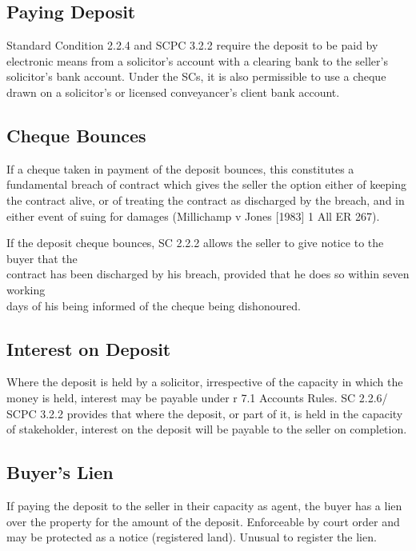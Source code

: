 \documentclass[
]{article}
\begin{document}
\hypertarget{paying-deposit}{%
\subsection{Paying Deposit}\label{paying-deposit}}

Standard Condition 2.2.4 and SCPC 3.2.2 require the deposit to be paid
by electronic means from a solicitor's account with a clearing bank to
the seller's solicitor's bank account. Under the SCs, it is also
permissible to use a cheque drawn on a solicitor's or licensed
conveyancer's client bank account.

\hypertarget{cheque-bounces}{%
\subsection{Cheque Bounces}\label{cheque-bounces}}

If a cheque taken in payment of the deposit bounces, this constitutes a
fundamental breach of contract which gives the seller the option either
of keeping the contract alive, or of treating the contract as discharged
by the breach, and in either event of suing for damages (Millichamp v
Jones {[}1983{]} 1 All ER 267).

If the deposit cheque bounces, SC 2.2.2 allows the seller to give notice
to the buyer that the\\
contract has been discharged by his breach, provided that he does so
within seven working\\
days of his being informed of the cheque being dishonoured.

\hypertarget{interest-on-deposit}{%
\subsection{Interest on Deposit}\label{interest-on-deposit}}

Where the deposit is held by a solicitor, irrespective of the capacity
in which the money is held, interest may be payable under r 7.1 Accounts
Rules. SC 2.2.6/ SCPC 3.2.2 provides that where the deposit, or part of
it, is held in the capacity of stakeholder, interest on the deposit will
be payable to the seller on completion.

\hypertarget{buyers-lien}{%
\subsection{Buyer's Lien}\label{buyers-lien}}

If paying the deposit to the seller in their capacity as agent, the
buyer has a lien over the property for the amount of the deposit.
Enforceable by court order and may be protected as a notice (registered
land). Unusual to register the lien.
\end{document}
